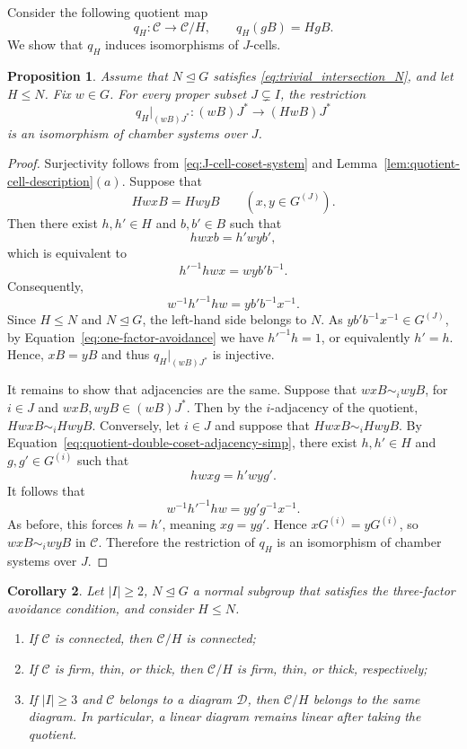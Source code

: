 \documentclass[10pt,a4paper]{amsart}
\newtheorem{prop}{Proposition}[section]
\newtheorem{coro}[prop]{Corollary}
\newcommand{\DD}{\mathcal{D}}
\newcommand{\CC}{\mathcal{C}}
\begin{document}
Consider the following quotient map 
\[
    q_H\colon\CC\longrightarrow\CC/H,
    \qquad q_H(gB)=HgB.
\]
We show that $q_H$ induces isomorphisms of $J$-cells.
\begin{prop}
\label{prop:correspondenceResidues}
Assume that $N\trianglelefteq G$ satisfies
\eqref{eq:trivial_intersection_N}, and let $H\leq N$.  Fix $w\in G$.  For every
proper subset $J\subsetneq I$, the restriction
\begin{equation*}
    q_H\big|_{(wB)J^*}\colon (wB)J^*\longrightarrow(HwB)J^*
\end{equation*}
is an isomorphism of chamber systems over $J$.
\end{prop}

\begin{proof}
Surjectivity follows from \eqref{eq:J-cell-coset-system} and Lemma~\ref{lem:quotient-cell-description}$(a)$.  Suppose that
\[
    HwxB=HwyB
    \qquad(x,y\in G^{(J)}).
\]
Then there exist $h,h'\in H$ and $b,b'\in B$ such that
\[
    hwxb=h'wyb',
\]
which is equivalent to
\[
 h'^{-1}hwx=wyb'b^{-1}.
\]
Consequently,
\[
w^{-1}h'^{-1}hw=yb'b^{-1} x^{-1}.
\]
Since $H\leq N$ and $N\trianglelefteq G$, the left-hand side belongs to $N$. As $yb'b^{-1}x^{-1}\in G^{(J)}$, by
Equation~\eqref{eq:one-factor-avoidance} we have $h'^{-1}h=1$, or equivalently $h'=h$. Hence,
$xB=yB$ and thus $q_H\big|_{(wB)J^*}$ is injective.

It remains to show that adjacencies are the same. 
Suppose that $wxB\sim_i wyB$, for $i\in J$ and $wxB,wyB\in (wB)J^*$. Then by the $i$-adjacency of the quotient, $HwxB\sim_i HwyB$.
Conversely, let $i\in J$ and
suppose that $HwxB\sim_i HwyB$.  By
Equation~\eqref{eq:quotient-double-coset-adjacency-simp}, there exist $h,h'\in H$ and
$g,g'\in G^{(i)}$ such that
\[
    hwxg=h'wyg'.
\]
It follows that
\[
w^{-1}h'^{-1}hw=yg'g^{-1}x^{-1}.
\]
As before, this forces $h=h'$, meaning $xg = yg'$.  Hence
$xG^{(i)}=yG^{(i)}$, so $wxB\sim_i wyB$ in $\CC$.  Therefore the restriction
of $q_H$ is an isomorphism of chamber systems over $J$.
\end{proof}


\begin{coro}
\label{cor:quot_transfer_thin_thick_linearity}
Let $|I|\geq2$, $N\trianglelefteq G$ a normal subgroup that satisfies
the three-factor avoidance condition, and consider $H\leq N$.
\begin{enumerate}
    \item If $\CC$ is connected, then $\CC/H$ is connected;
    \item If $\CC$ is firm, thin, or
thick, then $\CC/H$ is firm, thin, or thick, respectively;
    \item If $|I|\geq 3$ and $\CC$ belongs to a diagram $\DD$, then $\CC/H$ belongs to the same diagram. In particular, a linear diagram remains linear after taking the
quotient.
\end{enumerate}
\end{coro}
\end{document}
